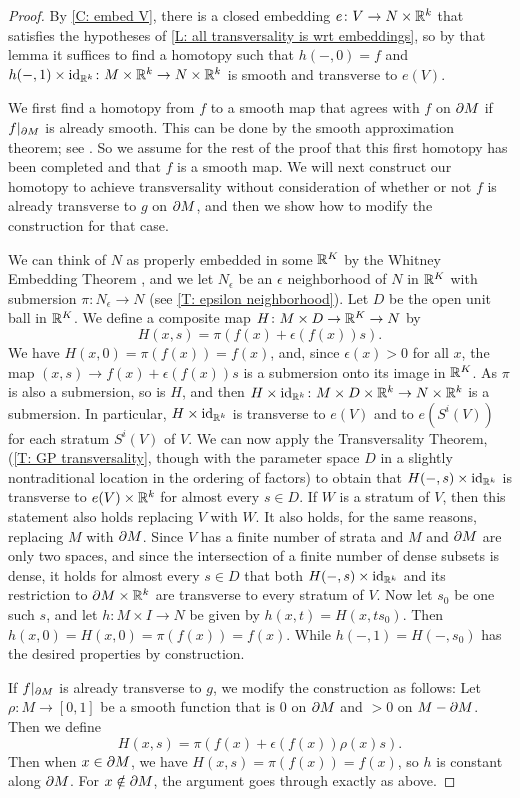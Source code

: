 \begin{proof}
	By \cref{C: embed V}, there is a closed embedding $e \colon V \to N \times \mathbb{R}^k$ that satisfies the hypotheses of \cref{L: all transversality is wrt embeddings}, so by that lemma it suffices to find a homotopy such that $h(-,0) = f$ and $h(-,1) \times \mathrm{id}_{\mathbb{R}^k} \colon M \times \mathbb{R}^k \to N \times \mathbb{R}^k$ is smooth and transverse to $e(V)$.

	We first find a homotopy from $f$ to a smooth map that agrees with $f$ on $\partial M$ if $f|_{\partial M}$ is already smooth.
	This can be done by the smooth approximation theorem; see \cite[Theorem III.2.5]{Kos93}.
	So we assume for the rest of the proof that this first homotopy has been completed and that $f$ is a smooth map.
	We will next construct our homotopy to achieve transversality without consideration of whether or not $f$ is already transverse to $g$ on $\partial M$, and then we show how to modify the construction for that case.

	We can think of $N$ as properly embedded in some $\mathbb{R}^K$ by the Whitney Embedding Theorem \cite[Section 1.8]{GuPo74}, and we let $N_\epsilon$ be an $\epsilon$ neighborhood of $N$ in $\mathbb{R}^K$ with submersion $\pi \colon N_\epsilon \to N$ (see \cref{T: epsilon neighborhood}).
	Let $D$ be the open unit ball in $\mathbb{R}^K$.
	We define a composite map $H \colon M \times D \to \mathbb{R}^K \to N$ by
	$$H(x,s) = \pi(f(x)+ \epsilon(f(x))s).$$
	We have $H(x,0) = \pi(f(x)) = f(x)$, and, since $\epsilon(x)>0$ for all $x$, the map $(x,s) \to f(x)+ \epsilon(f(x))s$ is a submersion onto its image in $\mathbb{R}^K$.
	As $\pi$ is also a submersion, so is $H$, and then $H \times \mathrm{id}_{\mathbb{R}^k} \colon M \times D \times \mathbb{R}^k \to N \times \mathbb{R}^k$ is a submersion.
	In particular, $H \times \mathrm{id}_{\mathbb{R}^k}$ is transverse to $e(V)$ and to $e(S^i(V))$ for each stratum $S^i(V)$ of $V$.
	We can now apply the Transversality Theorem, (\cref{T: GP transversality}, though with the parameter space $D$ in a slightly nontraditional location in the ordering of factors) to obtain that $H(-,s) \times \mathrm{id}_{\mathbb{R}^k}$ is transverse to $e(V) \times \mathbb{R}^k$ for almost every $s \in D$.
	If $W$ is a stratum of $V$, then this statement also holds replacing $V$ with $W$.
	It also holds, for the same reasons, replacing $M$ with $\partial M$.
	Since $V$ has a finite number of strata and $M$ and $\partial M$ are only two spaces, and since the intersection of a finite number of dense subsets is dense, it holds for almost every $s \in D$ that both $H(-,s) \times \mathrm{id}_{\mathbb{R}^k}$ and its restriction to $\partial M \times \mathbb{R}^k$ are transverse to every stratum of $V$.
	Now let $s_0$ be one such $s$, and let $h \colon M \times I \to N$ be given by $h(x,t) = H(x,ts_0)$.
	Then $h(x,0) = H(x,0) = \pi(f(x)) = f(x)$.
	While $h(-,1) = H(-,s_0)$ has the desired properties by construction.

	If $f|_{\partial M}$ is already transverse to $g$, we modify the construction as follows: Let $\rho \colon M \to [0,1]$ be a smooth function that is $0$ on $\partial M$ and $>0$ on $M-\partial M$.
	Then we define
	$$H(x,s) = \pi(f(x)+ \epsilon(f(x))\rho(x)s).$$
	Then when $x \in \partial M$, we have $H(x,s) = \pi(f(x)) = f(x)$, so $h$ is constant along $\partial M$.
	For $x \notin \partial M$, the argument goes through exactly as above.
\end{proof}

